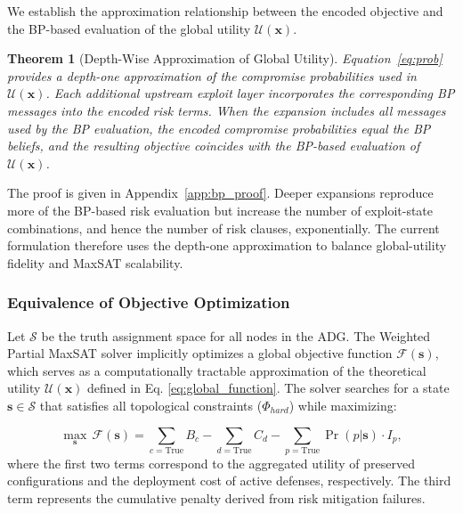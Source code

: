 \documentclass[conference]{IEEEtran}
\theoremstyle{definition} %
\theoremstyle{plain} %
\newtheorem{theorem}{Theorem}
\begin{document}
We establish the approximation relationship between the encoded objective and the BP-based evaluation of the global utility $\mathcal{U}(\mathbf{x})$.

{\color{red}
\begin{theorem}[Depth-Wise Approximation of Global Utility]
\label{thm:depth_bp}
Equation~\eqref{eq:prob} provides a depth-one approximation of the compromise probabilities used in $\mathcal{U}(\mathbf{x})$. Each additional upstream exploit layer incorporates the corresponding BP messages into the encoded risk terms. When the expansion includes all messages used by the BP evaluation, the encoded compromise probabilities equal the BP beliefs, and the resulting objective coincides with the BP-based evaluation of $\mathcal{U}(\mathbf{x})$.
\end{theorem}

\noindent The proof is given in Appendix~\ref{app:bp_proof}. Deeper expansions reproduce more of the BP-based risk evaluation but increase the number of exploit-state combinations, and hence the number of risk clauses, exponentially. The current formulation therefore uses the depth-one approximation to balance global-utility fidelity and MaxSAT scalability.}

\subsubsection{Equivalence of Objective Optimization}

Let $\mathcal{S}$ be the truth assignment space for all nodes in the ADG. The Weighted Partial MaxSAT solver implicitly optimizes a global objective function $\mathcal{F}(\mathbf{s})$, which serves as a computationally tractable approximation of the theoretical utility $\mathcal{U}(\mathbf{x})$ defined in Eq. \eqref{eq:global_function}. The solver searches for a state $\mathbf{s} \in \mathcal{S}$ that satisfies all topological constraints ($\Phi_{hard}$) while maximizing:

\begin{equation}
    \label{eq:solver_obj}
    \max_{\mathbf{s}}\, \mathcal{F}(\mathbf{s}) = \sum_{c =\text{True}} B_c - \sum_{d = \text{True}} C_d - \sum_{p = \text{True}} \Pr(p|\mathbf{s}) \cdot I_p,
\end{equation}
where the first two terms correspond to the aggregated utility of preserved configurations and the deployment cost of active defenses, respectively. The third term represents the cumulative penalty derived from risk mitigation failures.
\end{document}

